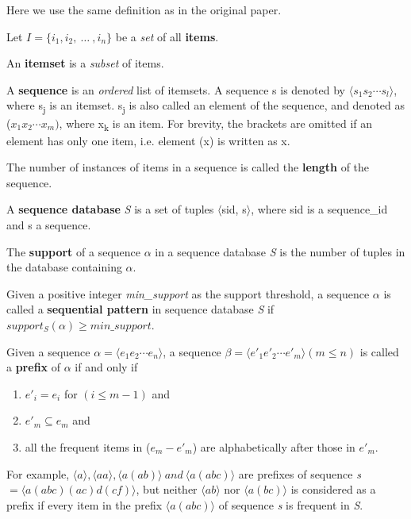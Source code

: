 \documentclass[a4paper,10pt,twocolumn]{article}
\begin{document}
Here we use the same definition as in the original paper. \cite{PrefixSpan}

Let $I=\{i_1, i_2,\ \ldots \ ,i_n\}$ be a \emph{set} of all \textbf{items}.

An \textbf{itemset} is a \emph{subset} of items. %

A \textbf{sequence} is an \emph{ordered} list of itemsets. A sequence s is denoted by $\langle s_1 s_2 \cdots s_l\rangle$, where s\textsubscript{j} is an itemset. s\textsubscript{j} is also called an element of the sequence, and denoted as ($x_1 x_2 \cdots x_m)$, where x\textsubscript{k} is an item. For brevity, the brackets are omitted if an element has only one item, i.e. element (x) is written as x.

The number of instances of items in a sequence is called the \textbf{length} of the sequence. 

A \textbf{sequence database} \textit{S} is a set of tuples $\langle$sid, s$\rangle$, where sid is a sequence\_id and s a sequence.

The \textbf{support} of a sequence $\alpha$  in a sequence database \textit{S} is the number of tuples in the database containing  $\alpha$.

Given a positive integer \textit{min\_support} as the support threshold, a sequence $\alpha$ is called a \textbf{sequential pattern} in sequence database \textit{S} if $support_S (\alpha) \geq  min\_support$.

Given a sequence $\alpha=\langle e_1 e_2 \cdots e_n \rangle$, a sequence $\beta=\langle e'_1 e'_2 \cdots e'_m\rangle \left(m\leq n\right)$ is called a \textbf{prefix} of $\alpha$ if and only if
\begin{enumerate}
\item $e'_i = e_i$  for $\left( i \leq m -1 \right)$ and
\item $e'_m \subseteq e_m$ and
\item all the frequent items in ($e_m - e'_m $) are alphabetically after those in $e'_m$.
\end{enumerate}
For example, $\langle a \rangle, \langle aa \rangle, \langle a(ab) \rangle \ and \  \langle a(abc)\rangle$ are prefixes of sequence \textit{s} $ =\langle a(abc)(ac)d(cf)\rangle $, but neither $\langle ab \rangle$  nor $\langle a(bc) \rangle$ is considered as a prefix if every item in the prefix $\langle a(abc)\rangle$  of sequence \textit{s} is frequent in \textit{S}.
\end{document}
